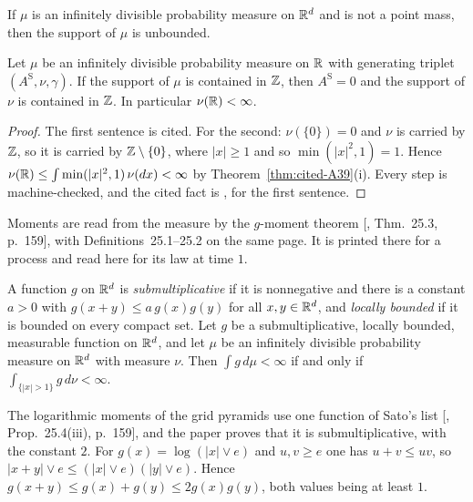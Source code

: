 \begin{theorem}
\label{thm:cited-A46}

If $\mu$ is an infinitely divisible probability measure on $\mathbb{R}^d$ and is not a point mass, then
the support of $\mu$ is unbounded.
\end{theorem}

\begin{theorem}
\label{thm:cited-A48}

Let $\mu$ be an infinitely divisible probability measure on $\mathbb{R}$ with generating triplet
$(A^{\mathrm S}, \nu, \gamma)$. If the support of $\mu$ is contained in $\mathbb{Z}$, then $A^{\mathrm S} = 0$ and the
support of $\nu$ is contained in $\mathbb{Z}$. In particular $\nu(\mathbb{R}) < \infty$.
\end{theorem}

\begin{proof}
The first sentence is cited. For the second: $\nu(\{0\}) = 0$ and $\nu$ is carried by $\mathbb{Z}$, so it
is carried by $\mathbb{Z} \setminus \{0\}$, where $|x| \ge 1$ and so $\min(|x|^2, 1) = 1$. Hence
$\nu(\mathbb{R}) \le \int \min(|x|^2, 1)\,\nu(dx) < \infty$ by Theorem~\ref{thm:cited-A39}(i). Every step
is machine-checked, and the cited fact is , for the first sentence.
\end{proof}

Moments are read from the \Levy{} measure by the $g$-moment theorem [,
Thm.~25.3, p.~159], with Definitions~25.1--25.2 on the same page. It is printed there for a
\Levy{} process and read here for its law at time $1$.

\begin{theorem}
\label{thm:cited-A49}

A function $g$ on $\mathbb{R}^d$ is \emph{submultiplicative} if it is nonnegative and there is a constant
$a > 0$ with $g(x + y) \le a\,g(x)g(y)$ for all $x, y \in \mathbb{R}^d$, and \emph{locally bounded} if it is
bounded on every compact set. Let $g$ be a submultiplicative, locally bounded, measurable function on
$\mathbb{R}^d$, and let $\mu$ be an infinitely divisible probability measure on $\mathbb{R}^d$ with \Levy{} measure
$\nu$. Then $\int g\,d\mu < \infty$ if and only if $\int_{\{|x| > 1\}}g\,d\nu < \infty$.
\end{theorem}

The logarithmic moments of the grid pyramids use one function of Sato's list
[, Prop.~25.4(iii), p.~159], and the paper proves that it is
submultiplicative, with the constant $2$. For $g(x) = \log(|x| \vee e)$ and $u, v \ge e$ one has
$u + v \le uv$, so $|x + y| \vee e \le (|x| \vee e)(|y| \vee e)$. Hence
$g(x + y) \le g(x) + g(y) \le 2g(x)g(y)$, both values being at least $1$.

